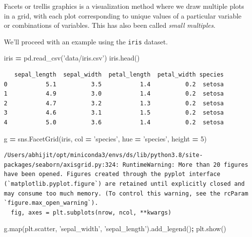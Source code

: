 \documentclass[
  letterpaper,
]{scrbook}
\newenvironment{Shaded}{\begin{snugshade}}{\end{snugshade}}
\newcommand{\BuiltInTok}[1]{#1}
\newcommand{\DecValTok}[1]{\textcolor[rgb]{0.00,0.00,0.81}{#1}}
\newcommand{\NormalTok}[1]{#1}
\newcommand{\OperatorTok}[1]{\textcolor[rgb]{0.81,0.36,0.00}{\textbf{#1}}}
\newcommand{\StringTok}[1]{\textcolor[rgb]{0.31,0.60,0.02}{#1}}
\begin{document}
Facets or trellis graphics is a visualization method where we draw multiple plots in a grid, with each plot corresponding to unique values of a particular variable or combinations of variables. This has also been called \emph{small multiples}.

We'll proceed with an example using the \texttt{iris} dataset.

\begin{Shaded}
\begin{Highlighting}[]
\NormalTok{iris }\OperatorTok{=}\NormalTok{ pd.read_csv(}\StringTok{'data/iris.csv'}\NormalTok{)}
\NormalTok{iris.head()}
\end{Highlighting}
\end{Shaded}

\begin{verbatim}
   sepal_length  sepal_width  petal_length  petal_width species
0           5.1          3.5           1.4          0.2  setosa
1           4.9          3.0           1.4          0.2  setosa
2           4.7          3.2           1.3          0.2  setosa
3           4.6          3.1           1.5          0.2  setosa
4           5.0          3.6           1.4          0.2  setosa
\end{verbatim}

\begin{Shaded}
\begin{Highlighting}[]
\NormalTok{g }\OperatorTok{=}\NormalTok{ sns.FacetGrid(iris, col }\OperatorTok{=} \StringTok{'species'}\NormalTok{, hue }\OperatorTok{=} \StringTok{'species'}\NormalTok{, height }\OperatorTok{=} \DecValTok{5}\NormalTok{)}
\end{Highlighting}
\end{Shaded}

\begin{verbatim}
/Users/abhijit/opt/miniconda3/envs/ds/lib/python3.8/site-packages/seaborn/axisgrid.py:324: RuntimeWarning: More than 20 figures have been opened. Figures created through the pyplot interface (`matplotlib.pyplot.figure`) are retained until explicitly closed and may consume too much memory. (To control this warning, see the rcParam `figure.max_open_warning`).
  fig, axes = plt.subplots(nrow, ncol, **kwargs)
\end{verbatim}

\begin{Shaded}
\begin{Highlighting}[]
\NormalTok{g.}\BuiltInTok{map}\NormalTok{(plt.scatter, }\StringTok{'sepal_width'}\NormalTok{, }\StringTok{'sepal_length'}\NormalTok{).add_legend()}\OperatorTok{;}
\NormalTok{plt.show()}
\end{Highlighting}
\end{Shaded}
\end{document}
